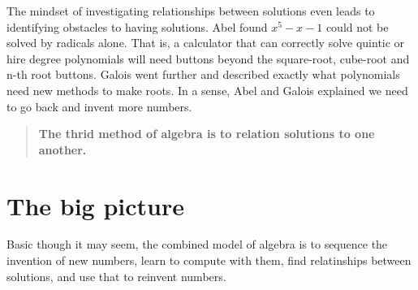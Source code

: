The mindset of investigating relationships between solutions even leads 
to identifying obstacles to having solutions.  Abel found $x^5-x-1$ could 
not be solved by radicals alone.  That is, a calculator that can correctly 
solve quintic or hire degree polynomials will need buttons beyond the square-root, cube-root and n-th root buttons.  Galois went further and described exactly what polynomials need new methods to make roots.  In 
a sense, Abel and Galois explained we need to go back and invent more numbers.

\begin{quote}
    \textbf{The thrid method of algebra is to relation solutions to one another.}
\end{quote}


\section{The big picture}
Basic though it may seem, the combined model of algebra is to sequence the 
invention of new numbers, learn to compute with them, find relatinships 
between solutions, and use that to reinvent numbers.
\begin{center}
\end{center}
